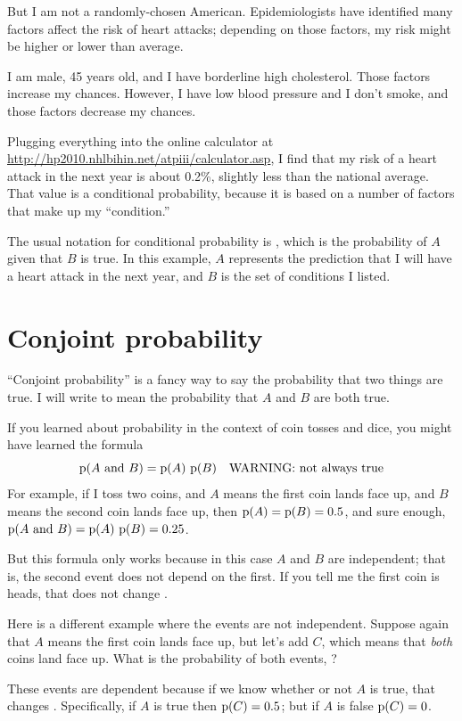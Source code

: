 \documentclass[12pt]{book}
\begin{document}
But I am not a randomly-chosen American.  Epidemiologists have
identified many factors affect the risk of heart attacks; depending on
those factors, my risk might be higher or lower than average.

I am male, 45 years old, and I have
borderline high cholesterol.  Those factors increase my chances.
However, I have low blood pressure and I don't smoke, and
those factors decrease my chances.

Plugging everything into the online calculator at
\url{http://hp2010.nhlbihin.net/atpiii/calculator.asp}, I find that my
risk of a heart attack in the next year is about 0.2\%, slightly
less than the national average.
That value is a conditional probability, because it is based on
a number of factors that make up my ``condition.''

The usual notation for conditional probability is , which
is the probability of $A$ given that $B$ is true.  In this
example, $A$ represents the prediction that I will have a heart
attack in the next year, and $B$ is the set of conditions I listed.


\section{Conjoint probability}

``Conjoint probability'' is a fancy way to say the probability that
two things are true.  I will write  to mean the
probability that $A$ and $B$ are both true.

If you learned about probability in the context of coin tosses and
dice, you might have learned the formula
%
\[ \mathrm{p}(A ~\mathrm{and}~ B) = \mathrm{p}(A)~\mathrm{p}(B) \quad\mbox{WARNING: not always true}\]
%
For example, if I toss two coins, and $A$ means the first coin lands
face up, and $B$ means the second coin lands face up, then $\mathrm{p}(A) =
\mathrm{p}(B) = 0.5$, and sure enough, $\mathrm{p}(A ~\mathrm{and}~ B) = \mathrm{p}(A)~\mathrm{p}(B) = 0.25$.

But this formula only works because in this case $A$ and $B$ are
independent; that is, the second event does not depend on the first.
If you tell me the first coin is heads, that does not change .

Here is a different example where the events are not independent.
Suppose again that $A$ means the first coin lands face up, but let's
add $C$, which means that {\em both} coins land face up.  What is the
probability of both events, ?

These events are dependent because if we know whether or not $A$ is
true, that changes .  Specifically, if $A$ is true then $\mathrm{p}(C)
= 0.5$; but if $A$ is false $\mathrm{p}(C) = 0$.
\end{document}
